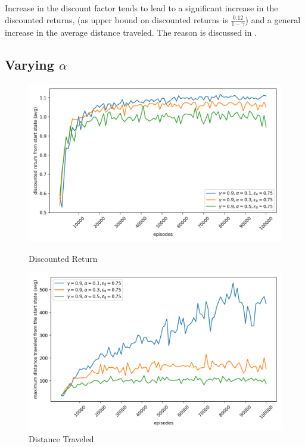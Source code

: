 Increase in the discount factor tends to lead to a significant increase in the discounted returns, (as upper bound on discounted returns is $\frac{0.12}{1 - \gamma}$)  and a general increase in the average distance traveled. The reason is discussed in .




\subsection{Varying $\alpha$}

\begin{figure}[H]
    \centering
    \begin{minipage}{0.49\linewidth}
        \centering
        \includegraphics[width=\linewidth]{plots/part1-c-rewards.png}
        \caption{Discounted Return}
    \end{minipage}
    \hfill
    \begin{minipage}{0.49\linewidth}
        \centering
        \includegraphics[width=\linewidth]{plots/part1-c-distances.png}
        \caption{Distance Traveled}
    \end{minipage}


\end{figure}
